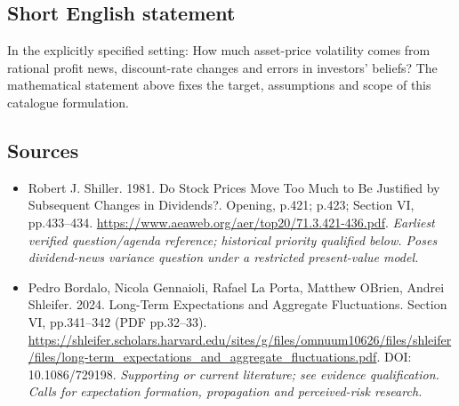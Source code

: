 \documentclass[11pt]{article}
\begin{document}
\subsection{Short English statement}
In the explicitly specified setting: How much asset-price volatility comes from rational profit news, discount-rate changes and errors in investors’ beliefs? The mathematical statement above fixes the target, assumptions and scope of this catalogue formulation.

\subsection{Sources}
\begin{itemize}\raggedright
\item[\textnormal{[S1]}]\hypertarget{source:30007593:1}{} Robert J. Shiller. 1981. Do Stock Prices Move Too Much to Be Justified by Subsequent Changes in Dividends?. Opening, p.421; p.423; Section VI, pp.433–434.
\url{https://www.aeaweb.org/aer/top20/71.3.421-436.pdf}.
{\small\textit{Earliest verified question/agenda reference; historical priority qualified below. Poses dividend-news variance question under a restricted present-value model.}}

\item[\textnormal{[S2]}]\hypertarget{source:30007593:2}{} Pedro Bordalo, Nicola Gennaioli, Rafael La Porta, Matthew OBrien, Andrei Shleifer. 2024. Long-Term Expectations and Aggregate Fluctuations. Section VI, pp.341–342 (PDF pp.32–33).
\url{https://shleifer.scholars.harvard.edu/sites/g/files/omnuum10626/files/shleifer/files/long-term_expectations_and_aggregate_fluctuations.pdf}.
DOI: 10.1086/729198.
{\small\textit{Supporting or current literature; see evidence qualification. Calls for expectation formation, propagation and perceived-risk research.}}
\end{itemize}
\end{document}
